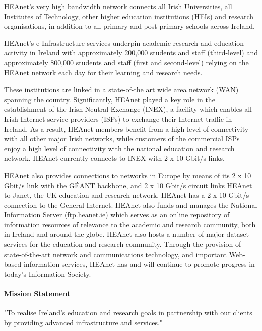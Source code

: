 \documentclass{article}
\begin{document}
	HEAnet's very high bandwidth network connects all Irish Universities, all Institutes of Technology, other higher education institutions (HEIs) and research organisations, in addition to all primary and post-primary schools across Ireland.
	
	HEAnet's e-Infrastructure services underpin academic research and education activity in Ireland with approximately 200,000 students and staff (third-level) and approximately 800,000 students and staff (first and second-level) relying on the HEAnet network each day for their learning and research needs.
	
	These institutions are linked in a state-of-the art wide area network (WAN) spanning the country. Significantly, HEAnet played a key role in the establishment of the Irish Neutral Exchange (INEX), a facility which enables all Irish Internet service providers (ISPs) to exchange their Internet traffic in Ireland. As a result, HEAnet members benefit from a high level of connectivity with all other major Irish networks, while customers of the commercial ISPs enjoy a high level of connectivity with the national education and research network. HEAnet currently connects to INEX with 2 x 10 Gbit/s links.
	
	HEAnet also provides connections to networks in Europe by means of its 2 x 10 Gbit/s link with the GÉANT backbone, and 2 x 10 Gbit/s circuit links HEAnet to Janet, the UK education and research network. HEAnet has a 2 x 10 Gbit/s connection to the General Internet. HEAnet also funds and manages the National Information Server (ftp.heanet.ie) which serves as an online repository of information resources of relevance to the academic and research community, both in Ireland and around the globe. HEAnet also hosts a number of major dataset services for the education and research community. Through the provision of state-of-the-art network and communications technology, and important Web-based information services, HEAnet has and will continue to promote progress in today's Information Society.
	
	\paragraph{Mission Statement}
	"To realise Ireland's education and research goals in partnership with our clients by providing advanced infrastructure and services."
\end{document}
